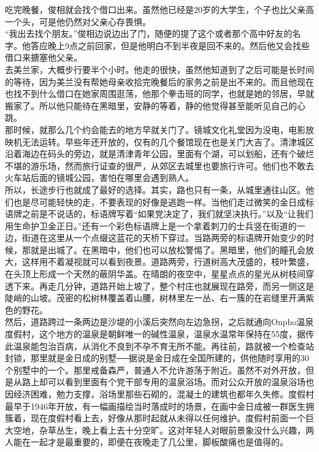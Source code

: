 \begin{multicols}{\theparacolNo}
吃完晚餐，俊相就会找个借口出来。虽然他已经是20岁的大学生，个子也比父亲高一个头，可是他仍然对父亲心存畏惧。\\

“我出去找个朋友。”俊相边说边出了门，随便的提了这个或者那个高中好友的名字。他答应晚上9点之前回家，但是他明白不到半夜是回不来的。然后他又会找些借口来搪塞他父亲。\\

去美兰家，大概步行要半个小时。他走的很快，虽然他知道到了之后可能是长时间的等待，因为美兰没有帮她母亲收拾完晚餐后的家务之前是出不来的。而且他现在也找不到什么借口在她家周围逛荡，他那个拳击班的同学，也就是她的邻居，早就搬家了。所以他只能待在黑暗里，安静的等着，静的他觉得甚至能听见自己的心跳。\\

那时候，就那么几个约会能去的地方早就关门了。镜城文化礼堂因为没电，电影放映机无法运转。早些年还开放的，仅有的几个餐馆现在也是关门大吉了。清津城区沿着海边在码头的旁边，就是清津青年公园，里面有个湖，可以划船，还有个破烂不堪的游乐场，然而旅行证查的很严，从郊区去城里也要旅行许可。他们也不敢去火车站后面的镜城公园，害怕在哪里会遇到熟人。\\

所以，长途步行也就成了最好的选择。其实，路也只有一条，从城里通往山区。他们也是尽可能轻快的走，不要表现的好像是逃跑一样。当他们走过微笑的金日成标语牌之前是不说话的，标语牌写着“如果党决定了，我们就坚决执行。”以及“让我们用生命护卫金正日。”还有一个彩色标语牌上是一个拿着刺刀的士兵竖在街道的一边，街道在这里从一个点缀这蓝花的天桥下穿过。当路两旁的标语牌开始变少的时候，那就是出城了。在黑暗中，他们也可以放松警惕了。黑暗里，他们的瞳孔会放大，这样用不着凝视就可以看到夜景。道路两旁，行道树高大茂盛的，枝叶繁盛，在头顶上形成一个天然的蔽阴华盖。在晴朗的夜空中，星星点点的星光从树枝间穿透下来。再走几分钟，道路开始上坡了，整个村庄也就展现在路旁，而另一侧这是陡峭的山坡。茂密的松树林覆盖着山腰，树林里左一丛、右一簇的在岩缝里开满紫色的野花。\\

然后，道路跨过一条两边是沙堤的小溪后突然向左边急拐，之后就通向Onpho温泉度假村，这个地方的温泉是朝鲜唯一的碱性温泉，温泉水温常年保持在55度，据传此温泉能包治百病，从消化不良到不孕不育无所不能。再往前，路就被一个检查站封锁，那里就是金日成的别墅──据说是金日成在全国所建的，供他随时享用的30个别墅中的一个。那里戒备森严，普通人不允许游荡于附近。虽然不对外开放，但是从路上却可以看到里面有个党干部专用的温泉浴场。而对公众开放的温泉浴场也因经济困难，勉力支撑，浴场里那些石砌的，混凝土的建筑也都年久失修。度假村最早于1946年开放，有一幅画描绘当时落成时的场景，在画中金日成被一群医生拥簇着，现在度假村看上去，好像从那时起就从未得以任何维护。度假村前面一个巨大空地，杂草丛生，晚上看上去十分空旷。这对年轻人对眼前景象没什么兴趣，两人能在一起才是最重要的，即便在夜晚走了几公里，脚板酸痛也是值得的。\\


\end{multicols}
